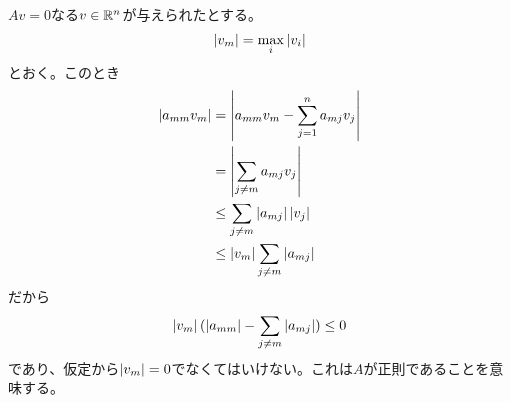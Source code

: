 \newpage


\subsubsection{}%
\begin{sol}
  $Av=0$なる$v \in \R^n$が与えられたとする。
  \[
  \abs{v_m} = \max_i \abs{v_i}
  \]
  とおく。このとき
  \begin{align*}
    \abs{ a_{mm} v_m } &= \abs{ a_{mm} v_m - \sum_{j=1}^n a_{mj} v_j } \\
    &= \abs{\sum_{j \neq m} a_{mj} v_j } \\
    &\leq \sum_{j \neq m} \abs{ a_{mj}} \abs{  v_j } \\
    &\leq \abs{v_m} \sum_{j \neq m}  \abs{  a_{mj} }
  \end{align*}
  だから
  \[
  \abs{v_m} ( \abs{a_{mm}} - \sum_{j \neq m}  \abs{  a_{mj} } ) \leq 0
  \]
  であり、仮定から$\abs{v_m} = 0$でなくてはいけない。これは$A$が正則であることを意味する。
\end{sol}
